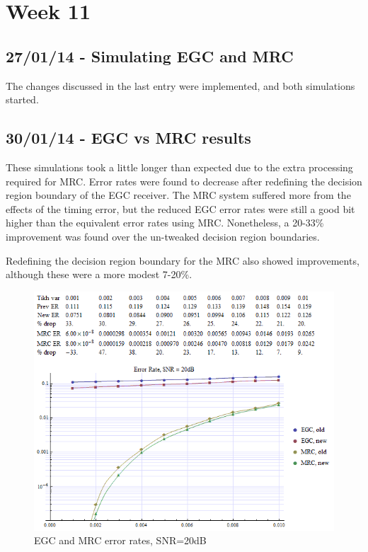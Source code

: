 \section{Week 11}

\subsection{27/01/14 - Simulating EGC and MRC}

The changes discussed in the last entry were implemented, and both
simulations started.

\subsection{30/01/14 - EGC vs MRC results}

These simulations took a little longer than expected due to the extra
processing required for MRC. Error rates were found to decrease after
redefining the decision region boundary of the EGC receiver. The MRC
system suffered more from the effects of the timing error, but the
reduced EGC error rates were still a good bit higher than the equivalent
error rates using MRC. Nonetheless, a 20-33\% improvement was found over
the un-tweaked decision region boundaries.

Redefining the decision region boundary for the MRC also showed
improvements, although these were a more modest 7-20\%.

\begin{figure}[htbp]
\centering
\includegraphics[width=\linewidth]{../../../plots/egc_mrc_20db.png}
\caption{EGC and MRC error rates, SNR=20dB}
\end{figure}

